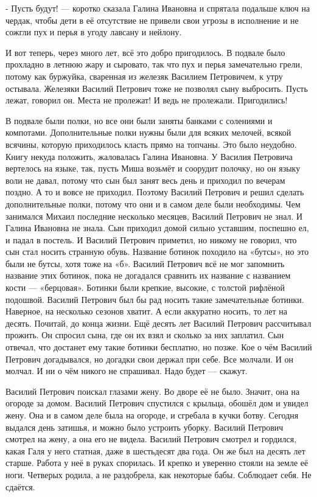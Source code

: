 - Пусть будут! --- коротко сказала Галина Ивановна и спрятала подальше ключ на чердак, чтобы дети в её отсутствие не привели свои угрозы в исполнение и не сожгли пух и перья в угоду лавсану и нейлону.

И вот теперь, через много лет, всё это добро пригодилось. В подвале было
прохладно в летнюю жару и сыровато, так что пух и перья замечательно грели,
потому как буржуйка, сваренная из железяк Василием Петровичем, к утру остывала.
Железяки Василий Петрович тоже не позволял сыну выбросить. Пусть лежат, говорил
он. Места не пролежат! И ведь не пролежали. Пригодились!

В подвале были полки, но все они были заняты банками с солениями и компотами.
Дополнительные полки нужны были для всяких мелочей, всякой всячины, которую
приходилось класть прямо на топчаны. Это было неудобно. Книгу некуда положить,
жаловалась Галина Ивановна. У Василия Петровича вертелось на языке, так, пусть
Миша возьмёт и соорудит полочку, но он языку воли не давал, потому что сын был
занят весь день и приходил по вечерам поздно. А то и вовсе не приходил. Поэтому
Василий Петрович и решил сделать дополнительные полки, потому что они и в самом
деле были необходимы. Чем занимался Михаил последние несколько месяцев, Василий
Петрович не знал. И Галина Ивановна не знала. Сын приходил домой сильно
уставшим, поспешно ел, и падал в постель. И Василий Петрович приметил, но
никому не говорил, что сын стал носить странную обувь. Название ботинок
походило на «бутсы», но это были не бутсы, хотя тоже на «б». Василий Петрович
всё не мог запомнить название этих ботинок, пока не догадался сравнить их
название с названием кости --- «берцовая». Ботинки были крепкие, высокие, с
толстой рифлёной подошвой. Василий Петрович был бы рад носить такие
замечательные ботинки. Наверное, на несколько сезонов хватит. А если аккуратно
носить, то лет на десять. Почитай, до конца жизни. Ещё десять лет Василий
Петрович рассчитывал прожить. Он спросил сына, где он их взял и сколько за них
заплатил. Сын отвечал, что достанет ему такие ботинки бесплатно, но позже. Кое
о чём Василий Петрович догадывался, но догадки свои держал при себе. Все
молчали. И он молчал. И ни о чём никого не спрашивал. Надо будет --- скажут.

Василий Петрович поискал глазами жену. Во дворе её не было. Значит, она на
огороде за домом. Василий Петрович спустился с крыльца, обошёл дом и увидел
жену. Она и в самом деле была на огороде, и сгребала в кучки ботву. Сегодня
выдался день затишья, и можно было устроить уборку.  Василий Петрович смотрел
на жену, а она его не видела. Василий Петрович смотрел и гордился, какая Галя у
него статная, даже в шестьдесят два года. Он же был на десять лет старше.
Работа у неё в руках спорилась. И крепко и уверенно стояли на земле её ноги.
Четверых родила, а не раздобрела, как некоторые бабы. Соблюдает себя. Не
сдаётся.

